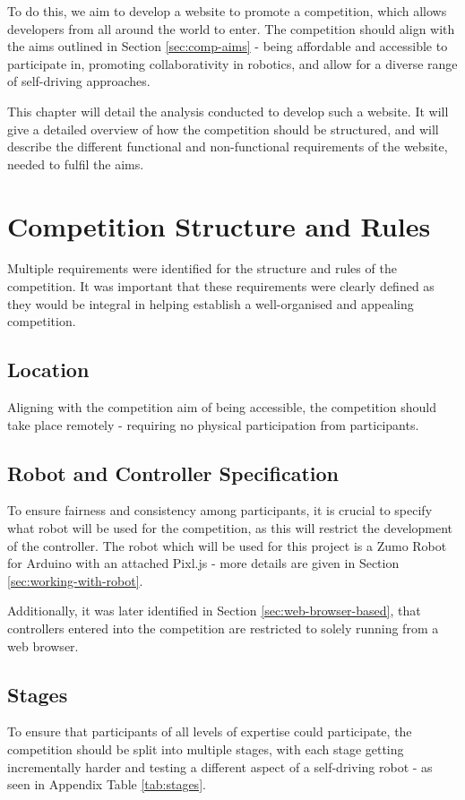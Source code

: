 \documentclass{l4proj}
\begin{document}
To do this, we aim to develop a website to promote a competition, which allows developers from all around the world to enter. The competition should align with the aims outlined in Section \ref{sec:comp-aims} - being affordable and accessible to participate in, promoting collaborativity in robotics, and allow for a diverse range of self-driving approaches.

This chapter will detail the analysis conducted to develop such a website. It will give a detailed overview of how the competition should be structured, and will describe the different functional and non-functional requirements of the website, needed to fulfil the aims.


\section{Competition Structure and Rules}
Multiple requirements were identified for the structure and rules of the competition. It was important that these requirements were clearly defined as they would be integral in helping establish a well-organised and appealing competition.

\subsection{Location}
Aligning with the competition aim of being accessible, the competition should take place remotely - requiring no physical participation from participants.

\subsection{Robot and Controller Specification}\label{sec:robot-specification}
To ensure fairness and consistency among participants, it is crucial to specify what robot will be used for the competition, as this will restrict the development of the controller. The robot which will be used for this project is a Zumo Robot for Arduino with an attached Pixl.js - more details are given in Section \ref{sec:working-with-robot}.

Additionally, it was later identified in Section \ref{sec:web-browser-based}, that controllers entered into the competition are restricted to solely running from a web browser.

\subsection{Stages}
To ensure that participants of all levels of expertise could participate, the competition should be split into multiple stages, with each stage getting incrementally harder and testing a different aspect of a self-driving robot - as seen in Appendix Table \ref{tab:stages}.
\end{document}
